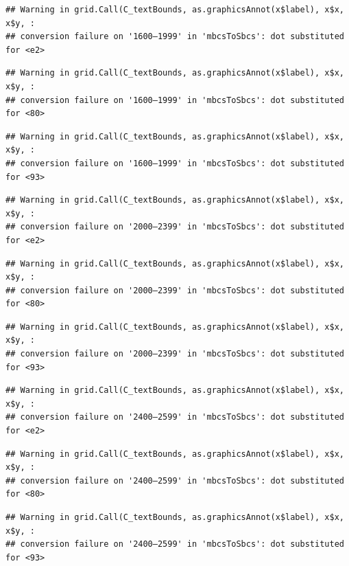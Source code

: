 \documentclass[
]{article}
\begin{document}
\begin{verbatim}
## Warning in grid.Call(C_textBounds, as.graphicsAnnot(x$label), x$x, x$y, :
## conversion failure on '1600–1999' in 'mbcsToSbcs': dot substituted for <e2>
\end{verbatim}

\begin{verbatim}
## Warning in grid.Call(C_textBounds, as.graphicsAnnot(x$label), x$x, x$y, :
## conversion failure on '1600–1999' in 'mbcsToSbcs': dot substituted for <80>
\end{verbatim}

\begin{verbatim}
## Warning in grid.Call(C_textBounds, as.graphicsAnnot(x$label), x$x, x$y, :
## conversion failure on '1600–1999' in 'mbcsToSbcs': dot substituted for <93>
\end{verbatim}

\begin{verbatim}
## Warning in grid.Call(C_textBounds, as.graphicsAnnot(x$label), x$x, x$y, :
## conversion failure on '2000–2399' in 'mbcsToSbcs': dot substituted for <e2>
\end{verbatim}

\begin{verbatim}
## Warning in grid.Call(C_textBounds, as.graphicsAnnot(x$label), x$x, x$y, :
## conversion failure on '2000–2399' in 'mbcsToSbcs': dot substituted for <80>
\end{verbatim}

\begin{verbatim}
## Warning in grid.Call(C_textBounds, as.graphicsAnnot(x$label), x$x, x$y, :
## conversion failure on '2000–2399' in 'mbcsToSbcs': dot substituted for <93>
\end{verbatim}

\begin{verbatim}
## Warning in grid.Call(C_textBounds, as.graphicsAnnot(x$label), x$x, x$y, :
## conversion failure on '2400–2599' in 'mbcsToSbcs': dot substituted for <e2>
\end{verbatim}

\begin{verbatim}
## Warning in grid.Call(C_textBounds, as.graphicsAnnot(x$label), x$x, x$y, :
## conversion failure on '2400–2599' in 'mbcsToSbcs': dot substituted for <80>
\end{verbatim}

\begin{verbatim}
## Warning in grid.Call(C_textBounds, as.graphicsAnnot(x$label), x$x, x$y, :
## conversion failure on '2400–2599' in 'mbcsToSbcs': dot substituted for <93>
\end{verbatim}
\end{document}
